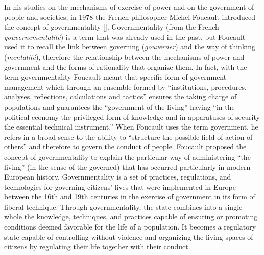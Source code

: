 In his studies on the mechanisms of exercise of power and on the government of people and societies, in 1978 the French philosopher Michel Foucault introduced the concept of governmentality [\citealt{chap:9:Foucault:2014}]. Governmentality (from the French \textit{gouvernementalit\'{e}}) is a term that was already used in the past, but Foucault used it to recall the link between governing (\textit{gouverner}) and the way of thinking (\textit{mentalit\'{e}}), therefore the relationship between the mechanisms of power and government and the forms of rationality that organize them. In fact, with the term governmentality Foucault meant that specific form of government management which through an ensemble formed by ``institutions, procedures, analyses, reflections, calculations and tactics'' ensures the taking charge of populations and guarantees the ``government of the living'' having ``in the political economy the privileged form of knowledge and in apparatuses of security the essential technical instrument.'' When Foucault uses the term government, he refers in a broad sense to the ability to ``structure the possible field of action of others'' and therefore to govern the conduct of people. Foucault proposed the concept of governmentality to explain the particular way of administering ``the living'' (in the sense of the governed) that has occurred particularly in modern European history. Governmentality is a  set of practices, regulations, and technologies for governing citizens' lives that were implemented in Europe between the 16th and 19th centuries in the exercise of government in its form of liberal technique. Through governmentality, the state combines into a single whole the knowledge, techniques, and practices capable of ensuring or promoting conditions deemed favorable for the life of a population. It becomes a regulatory state capable of controlling without violence and organizing the living spaces of citizens by regulating their life together with their conduct.

